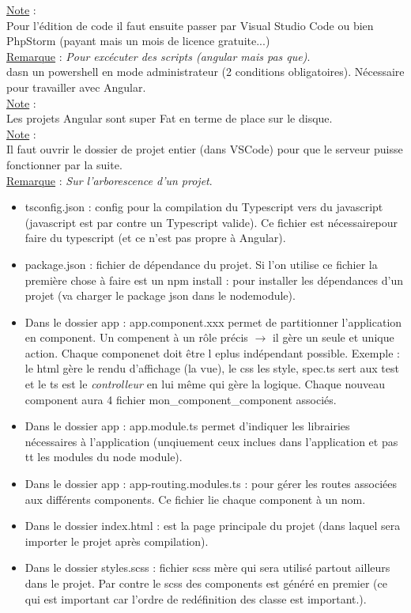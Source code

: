 \documentclass[a4paper,12pt,twoside]{article}
\newcommand{\incode}[1]{{\footnotesize\ttfamily #1}} %
\newcommand{\rem}[2]{\noindent\underline{Remarque} : \textit{#1}.\\ \indent #2}
\newcommand{\note}[1]{\noindent\underline{Note} : \\ \indent #1}
\begin{document}
\note{Pour l'édition de code il faut ensuite passer par Visual Studio Code ou bien PhpStorm (payant mais un mois de licence gratuite...)}\\

\rem{Pour excécuter des scripts (angular mais pas que)}{\incode{set-executionpolicy unrestricted} dasn un powershell en mode administrateur (2 conditions obligatoires). Nécessaire pour travailler avec Angular.}\\

\note{Les projets Angular sont super Fat en terme de place sur le disque.}\\

\note{Il faut ouvrir le dossier de projet entier (dans VSCode) pour que le serveur puisse fonctionner par la suite.}\\

\rem{Sur l'arborescence d'un projet}{
\begin{itemize}
\item \incode{tsconfig.json} : config pour la compilation du Typescript vers du javascript (javascript est par contre un Typescript valide). Ce fichier est nécessairepour faire du typescript (et ce n'est pas propre à Angular).
\item \incode{package.json} : fichier de dépendance du projet. Si l'on utilise ce fichier la première chose à faire est un \incode{npm install} : pour installer les dépendances d'un projet (va charger le package json dans le nodemodule).
\item Dans le dossier \incode{app} : \incode{app.component.xxx} permet de partitionner l'application en component. Un compenent à un rôle précis $\to$ il gère un seule et unique action. Chaque componenet doit être l eplus indépendant possible. Exemple : le html gère le rendu d'affichage (la vue), le css les style, spec.ts sert aux test et le ts est le \textit{controlleur} en lui même qui gère la logique. Chaque nouveau component aura 4 fichier mon\_component\_component associés.
\item Dans le dossier \incode{app} : \incode{app.module.ts} permet d'indiquer les librairies nécessaires à l'application (unqiuement ceux inclues dans l'application et pas tt les modules du node module).
\item Dans le dossier \incode{app} : \incode{app-routing.modules.ts} : pour gérer les routes associées aux différents components. Ce fichier lie chaque component à un nom.
\item Dans le dossier \incode{index.html} : est la page principale du projet (dans laquel sera importer le projet après compilation).
\item Dans le dossier \incode{styles.scss} : fichier scss mère qui sera utilisé partout ailleurs dans le projet. Par contre le scss des components est généré en premier (ce qui est important car l'ordre de redéfinition des classe est important.).\\
\end{itemize}
}
\end{document}
